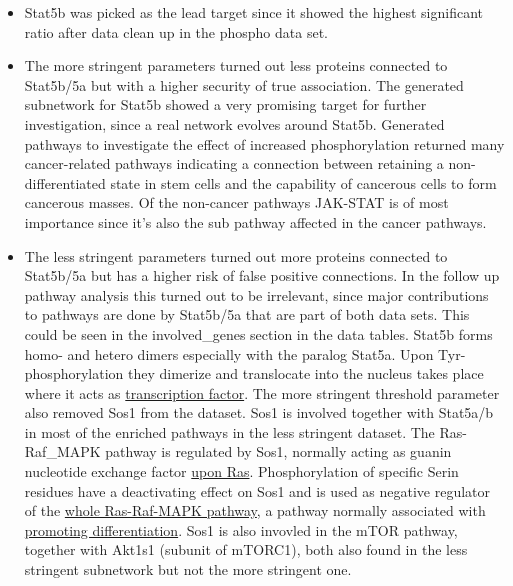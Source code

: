 \documentclass[
]{article}
\begin{document}
\begin{itemize}
\item
  Stat5b was picked as the lead target since it showed the highest
  significant ratio after data clean up in the phospho data set.
\item
  The more stringent parameters turned out less proteins connected to
  Stat5b/5a but with a higher security of true association. The
  generated subnetwork for Stat5b showed a very promising target for
  further investigation, since a real network evolves around Stat5b.
  Generated pathways to investigate the effect of increased
  phosphorylation returned many cancer-related pathways indicating a
  connection between retaining a non-differentiated state in stem cells
  and the capability of cancerous cells to form cancerous masses. Of the
  non-cancer pathways JAK-STAT is of most importance since it's also the
  sub pathway affected in the cancer pathways.
\item
  The less stringent parameters turned out more proteins connected to
  Stat5b/5a but has a higher risk of false positive connections. In the
  follow up pathway analysis this turned out to be irrelevant, since
  major contributions to pathways are done by Stat5b/5a that are part of
  both data sets. This could be seen in the involved\_genes section in
  the data tables. Stat5b forms homo- and hetero dimers especially with
  the paralog Stat5a. Upon Tyr-phosphorylation they dimerize and
  translocate into the nucleus takes place where it acts as
  \href{https://doi.org/10.1074/jbc.274.32.22484}{transcription factor}.
  The more stringent threshold parameter also removed Sos1 from the
  dataset. Sos1 is involved together with Stat5a/b in most of the
  enriched pathways in the less stringent dataset. The Ras-Raf\_MAPK
  pathway is regulated by Sos1, normally acting as guanin nucleotide
  exchange factor \href{https://doi.org/10.1083/jcb.200103146}{upon
  Ras}. Phosphorylation of specific Serin residues have a deactivating
  effect on Sos1 and is used as negative regulator of the
  \href{https://doi.org/10.1042/BJ20120938}{whole Ras-Raf-MAPK pathway},
  a pathway normally associated with
  \href{https://doi.org/10.1002/jcp.28334}{promoting differentiation}.
  Sos1 is also invovled in the mTOR pathway, together with Akt1s1
  (subunit of mTORC1), both also found in the less stringent subnetwork
  but not the more stringent one.


\end{itemize}
\end{document}
